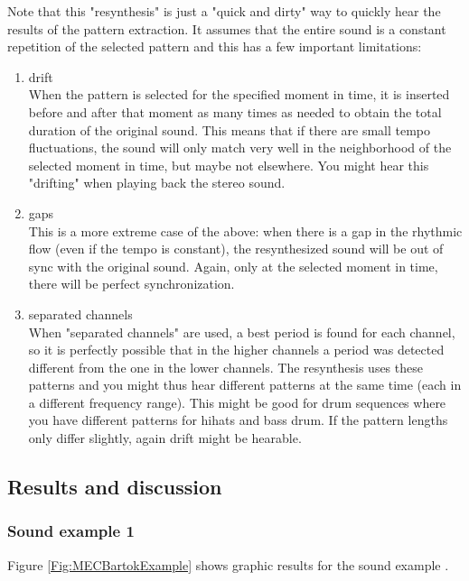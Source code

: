 Note that this "resynthesis" is just a "quick and dirty" way to
quickly hear the results of the pattern extraction. It assumes
that the entire sound is a constant repetition of the selected
pattern and this has a few important limitations:
\begin{enumerate}
\item drift\\
When the pattern is selected for the specified moment in time, it
is inserted before and after that moment as many times as needed
to obtain the total duration of the original sound. This means
that if there are small tempo fluctuations, the sound will only
match very well in the neighborhood of the selected moment in
time, but maybe not elsewhere. You might hear this "drifting" when
playing back the stereo sound.
\item gaps\\
This is a more extreme case of the above: when there is a gap in
the rhythmic flow (even if the tempo is constant), the
resynthesized sound will be out of sync with the original sound.
Again, only at the selected moment in time, there will be perfect
synchronization.
\item separated channels\\
When "separated channels" are used, a best period is found for
each channel, so it is perfectly possible that in the higher
channels a period was detected different from the one in the lower
channels. The resynthesis uses these patterns and you might thus
hear different patterns at the same time (each in a different
frequency range). This might be good for drum sequences where you
have different patterns for hihats and bass drum. If the pattern
lengths only differ slightly, again drift might be hearable.
\end{enumerate}


\subsection{Results and discussion}

\subsubsection*{Sound example 1}

Figure \ref{Fig:MECBartokExample} shows graphic results for the
sound example
.\\

